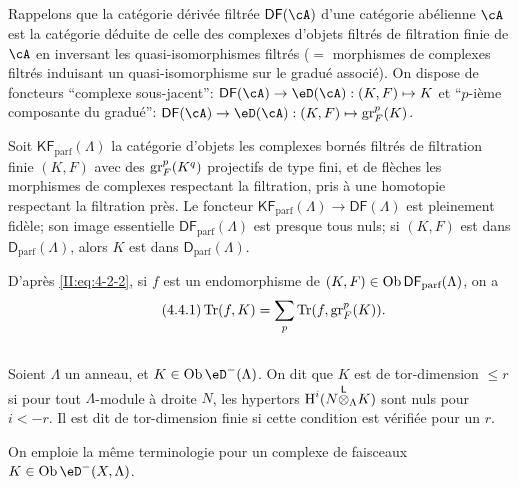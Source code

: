 \subsection{}\label{II:4-4}

Rappelons que la catégorie dérivée filtrée $\mathsf{DF}(\cA)$ d'une catégorie 
abélienne $\cA$ est la catégorie déduite de celle des complexes d'objets 
filtrés de filtration finie de $\cA$ en inversant les quasi-isomorphismes 
filtrés ($=$ morphismes de complexes filtrés induisant un quasi-isomorphisme 
sur le gradué associé). On dispose de foncteurs ``complexe sous-jacent'': 
$\mathsf{DF}(\cA)\to\eD(\cA): (K,F)\mapsto K$ et ``$p$-ième composante du 
gradué'': $\mathsf{DF}(\cA)\to\eD(\cA): (K,F)\mapsto \gr_F^p(K)$. 

Soit $\mathsf{KF}_\text{parf}(\Lambda)$ la catégorie d'objets les complexes 
bornés filtrés de filtration finie $(K,F)$ avec des $\operatorname{gr}_F^p(K^q)$ projectifs 
de type fini, et de flèches les morphismes de complexes respectant la 
filtration, pris à une homotopie respectant la filtration près. Le foncteur 
$\mathsf{KF}_\text{parf}(\Lambda)\to\mathsf{DF}(\Lambda)$ est pleinement fidèle; 
son image essentielle $\mathsf{DF}_\text{parf}(\Lambda)$ est presque tous nuls; 
si $(K,F)$ est dans $\mathsf{D}_\text{parf}(\Lambda)$, alors $K$ est dans 
$\mathsf{D}_\text{parf}(\Lambda)$. 

D'après \eqref{II:eq:4-2-2}, si $f$ est un endomorphisme de 
$(K,F)\in\operatorname{Ob}\mathsf{DF}_\text{parf}(\Lambda)$, on a 
\begin{equation*}\tag{4.4.1}\label{II:eq:4-4-1}
 \operatorname{Tr}(f,K) = \sum_p \operatorname{Tr}(f,\operatorname{gr}_F^p(K)) \text{.}
\end{equation*}





\subsection{}\label{II:4-5}

Soient $\Lambda$ un anneau, et $K\in\ob\eD^-(\Lambda)$. On dit que $K$ est de 
tor-dimension $\leqslant r$ si pour tout $\Lambda$-module à droite $N$, les 
hypertors $\operatorname{H}^i(N{\overset{\mathsf{L}}{\otimes}}_\Lambda K)$ sont nuls pour $i<-r$. Il est dit de 
tor-dimension finie si cette condition est vérifiée pour un $r$. 

On emploie la même terminologie pour un complexe de faisceaux 
$K\in\ob\eD^-(X,\Lambda)$. 





